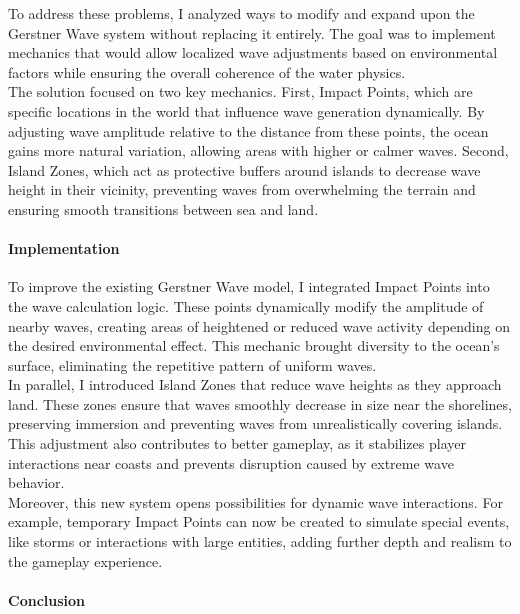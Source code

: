 \documentclass{article}
\begin{document}
To address these problems, I analyzed ways to modify and expand upon the Gerstner Wave system without replacing it entirely. The goal was to implement mechanics that would allow localized wave adjustments based on environmental factors while ensuring the overall coherence of the water physics.\\

The solution focused on two key mechanics. First, Impact Points, which are specific locations in the world that influence wave generation dynamically. By adjusting wave amplitude relative to the distance from these points, the ocean gains more natural variation, allowing areas with higher or calmer waves. Second, Island Zones, which act as protective buffers around islands to decrease wave height in their vicinity, preventing waves from overwhelming the terrain and ensuring smooth transitions between sea and land.

\paragraph{Implementation}\hfill

To improve the existing Gerstner Wave model, I integrated Impact Points into the wave calculation logic. These points dynamically modify the amplitude of nearby waves, creating areas of heightened or reduced wave activity depending on the desired environmental effect. This mechanic brought diversity to the ocean's surface, eliminating the repetitive pattern of uniform waves.\\

In parallel, I introduced Island Zones that reduce wave heights as they approach land. These zones ensure that waves smoothly decrease in size near the shorelines, preserving immersion and preventing waves from unrealistically covering islands. This adjustment also contributes to better gameplay, as it stabilizes player interactions near coasts and prevents disruption caused by extreme wave behavior.\\

Moreover, this new system opens possibilities for dynamic wave interactions. For example, temporary Impact Points can now be created to simulate special events, like storms or interactions with large entities, adding further depth and realism to the gameplay experience.

\paragraph{Conclusion}\hfill
\end{document}
